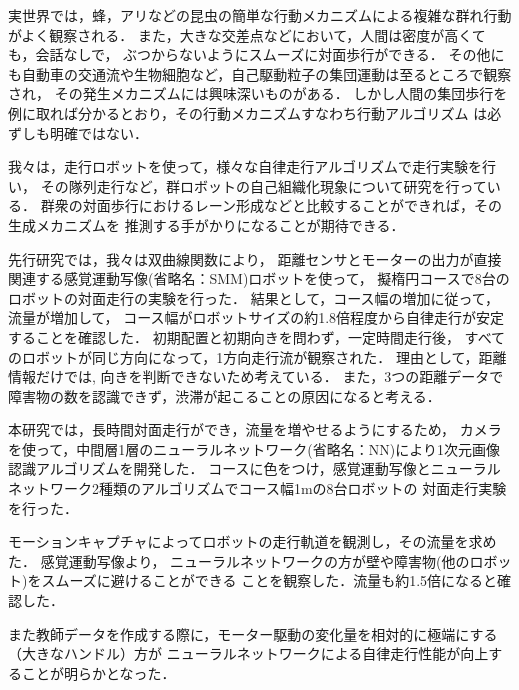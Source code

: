 実世界では，蜂，アリなどの昆虫の簡単な行動メカニズムによる複雑な群れ行動がよく観察される．
また，大きな交差点などにおいて，人間は密度が高くても，会話なしで，
ぶつからないようにスムーズに対面歩行ができる．
その他にも自動車の交通流や生物細胞など，自己駆動粒子の集団運動は至るところで観察され，
その発生メカニズムには興味深いものがある．
しかし人間の集団歩行を例に取れば分かるとおり，その行動メカニズムすなわち行動アルゴリズム
は必ずしも明確ではない\cite{murakami2021}．


我々は，走行ロボットを使って，様々な自律走行アルゴリズムで走行実験を行い，
その隊列走行など，群ロボットの自己組織化現象について研究を行っている．
群衆の対面歩行におけるレーン形成などと比較することができれば，その生成メカニズムを
推測する手がかりになることが期待できる．

先行研究\cite{li2020}では，我々は双曲線関数により，
距離センサとモーターの出力が直接関連する感覚運動写像(省略名：SMM)ロボットを使って，
擬楕円コースで8台のロボットの対面走行の実験を行った．
結果として，コース幅の増加に従って，流量が増加して，
コース幅がロボットサイズの約1.8倍程度から自律走行が安定することを確認した．
初期配置と初期向きを問わず，一定時間走行後，
すべてのロボットが同じ方向になって，1方向走行流が観察された．
理由として，距離情報だけでは, 向きを判断できないため考えている．
また，3つの距離データで障害物の数を認識できず，渋滞が起こることの原因になると考える．

本研究では，長時間対面走行ができ，流量を増やせるようにするため，
カメラを使って，中間層1層のニューラルネットワーク(省略名：NN)により1次元画像認識アルゴリズムを開発した．
コースに色をつけ，感覚運動写像とニューラルネットワーク2種類のアルゴリズムでコース幅1mの8台ロボットの
対面走行実験を行った．

モーションキャプチャによってロボットの走行軌道を観測し，その流量を求めた．
感覚運動写像より， ニューラルネットワークの方が壁や障害物(他のロボット)をスムーズに避けることができる
ことを観察した．流量も約1.5倍になると確認した．

また教師データを作成する際に，モーター駆動の変化量を相対的に極端にする（大きなハンドル）方が
ニューラルネットワークによる自律走行性能が向上することが明らかとなった．


